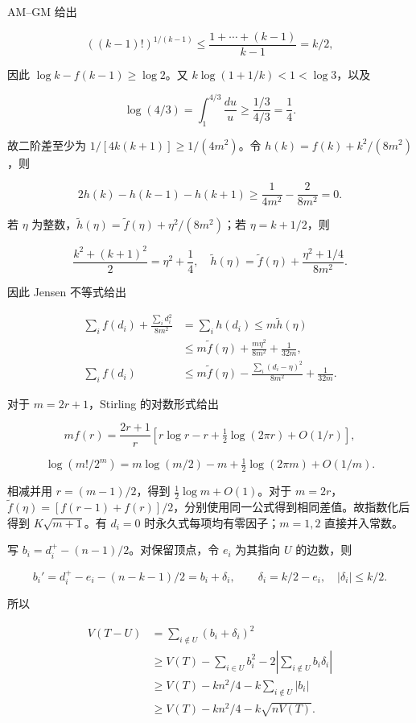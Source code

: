 \documentclass[11pt,a4paper]{article}
\begin{document}
AM--GM 给出

\[((k-1)!)^{1/(k-1)}\le\frac{1+\cdots+(k-1)}{k-1}=k/2,\]

因此 \(\log k-f(k-1)\ge\log2\)。又 \(k\log(1+1/k)<1<\log3\)，以及

\[\log(4/3)=\int_1^{4/3}\frac{du}{u}\ge\frac{1/3}{4/3}=\frac14.\]

故二阶差至少为 \(1/[4k(k+1)]\ge1/(4m^2)\)。令 \(h(k)=f(k)+k^2/(8m^2)\)，则

\[2h(k)-h(k-1)-h(k+1)
\ge\frac1{4m^2}-\frac2{8m^2}=0.\]

若 \(\eta\) 为整数，\(\widetilde h(\eta)=\widetilde f(\eta)+\eta^2/(8m^2)\)；若 \(\eta=k+1/2\)，则

\[\frac{k^2+(k+1)^2}{2}=\eta^2+\frac14,
\quad
\widetilde h(\eta)=\widetilde f(\eta)+\frac{\eta^2+1/4}{8m^2}.\]

因此 Jensen 不等式给出

\[\begin{aligned}
\sum_i f(d_i)+\frac{\sum_i d_i^2}{8m^2}
&=\sum_i h(d_i)\le m\widetilde h(\eta)\\
&\le m\widetilde f(\eta)+\frac{m\eta^2}{8m^2}+\frac1{32m},\\
\sum_i f(d_i)&\le m\widetilde f(\eta)
-\frac{\sum_i(d_i-\eta)^2}{8m^2}+\frac1{32m}.
\end{aligned}\]

对于 \(m=2r+1\)，Stirling 的对数形式给出

\[m f(r)=\frac{2r+1}{r}\left[r\log r-r+\tfrac12\log(2\pi r)+O(1/r)\right],\]

\[\log(m!/2^m)=m\log(m/2)-m+\tfrac12\log(2\pi m)+O(1/m).\]

相减并用 \(r=(m-1)/2\)，得到 \(\tfrac12\log m+O(1)\)。对于 \(m=2r\)， \(\widetilde f(\eta)=[f(r-1)+f(r)]/2\)，分别使用同一公式得到相同差值。故指数化后得到 \(K\sqrt{m+1}\)。有 \(d_i=0\) 时永久式每项均有零因子；\(m=1,2\) 直接并入常数。

写 \(b_i=d_i^+-(n-1)/2\)。对保留顶点，令 \(e_i\) 为其指向 \(U\) 的边数，则

\[b_i'=d_i^+-e_i-(n-k-1)/2=b_i+\delta_i,
\qquad\delta_i=k/2-e_i,\quad |\delta_i|\le k/2.\]

所以

\[\begin{aligned}
V(T-U)&=\sum_{i\notin U}(b_i+\delta_i)^2\\
&\ge V(T)-\sum_{i\in U}b_i^2-2\left|\sum_{i\notin U}b_i\delta_i\right|\\
&\ge V(T)-kn^2/4-k\sum_{i\notin U}|b_i|\\
&\ge V(T)-kn^2/4-k\sqrt{nV(T)}.
\end{aligned}\]
\end{document}
